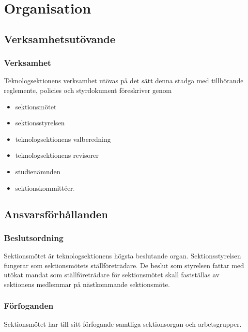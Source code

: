\section{Organisation}

\subsection{Verksamhetsutövande}

\subsubsection{Verksamhet}
Teknologsektionens verksamhet utövas på det sätt denna stadga med tillhörande reglemente, policies och styrdokument föreskriver genom

\begin{itemize}
	\item sektionsmötet
	\item sektionsstyrelsen 
	\item teknologsektionens valberedning
	\item teknologsektionens revisorer
	\item studienämnden 
	\item sektionskommittéer.
\end{itemize}

\subsection{Ansvarsförhållanden}

\subsubsection{Beslutsordning}
Sektionsmötet är teknologsektionens högsta beslutande organ. Sektionsstyrelsen fungerar som sektionsmötets ställföreträdare. De beslut som styrelsen fattar med utökat mandat som ställföreträdare för sektionsmötet skall fastställas av sektionens medlemmar på nästkommande sektionsmöte.

\subsubsection{Förfoganden}
Sektionsmötet har till sitt förfogande samtliga sektionsorgan och arbetsgrupper.


